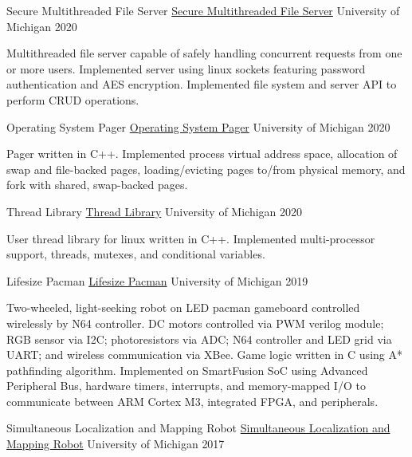 \documentclass[11pt, a4paper]{cv}
\begin{document}
\begin{cv}
\begin{projects}
\begin{cventries}
\cventrycompact
{\ifstrempty{}
{Secure Multithreaded File Server}
{\color{hrefblue}\href{}{Secure Multithreaded File Server}}}
{}
{University of Michigan}
{2020}
{\begin{cvparagraph}
Multithreaded file server capable of safely handling concurrent requests from one or more users. Implemented server using linux sockets featuring password authentication and AES encryption. Implemented file system and server API to perform CRUD operations.
\end{cvparagraph}}
\cventrycompact
{\ifstrempty{}
{Operating System Pager}
{\color{hrefblue}\href{}{Operating System Pager}}}
{}
{University of Michigan}
{2020}
{\begin{cvparagraph}
Pager written in C++. Implemented process virtual address space, allocation of swap and file-backed pages, loading/evicting pages to/from physical memory, and fork with shared, swap-backed pages.
\end{cvparagraph}}
\cventrycompact
{\ifstrempty{}
{Thread Library}
{\color{hrefblue}\href{}{Thread Library}}}
{}
{University of Michigan}
{2020}
{\begin{cvparagraph}
User thread library for linux written in C++. Implemented multi-processor support, threads, mutexes, and conditional variables.
\end{cvparagraph}}
\cventrycompact
{
{Lifesize Pacman}
{\color{hrefblue}\href{https://drive.google.com/drive/folders/1HFxNVsQWryOYPgpBHcxYYqhqPPS5R\_EB}{Lifesize Pacman}}}
{}
{University of Michigan}
{2019}
{\begin{cvparagraph}
Two-wheeled, light-seeking robot on LED pacman gameboard controlled wirelessly by N64 controller. DC motors controlled via PWM verilog module; RGB sensor via I2C; photoresistors via ADC; N64 controller and LED grid via UART; and wireless communication via XBee. Game logic written in C using A* pathfinding algorithm. Implemented on SmartFusion SoC using Advanced Peripheral Bus, hardware timers, interrupts, and memory-mapped I/O to communicate between ARM Cortex M3, integrated FPGA, and peripherals.
\end{cvparagraph}}
\cventrycompact
{
{Simultaneous Localization and Mapping Robot}
{\color{hrefblue}\href{https://drive.google.com/drive/folders/1YjzT\_7qpdkZjQ76zcOCCvEo-v1gyrCbw}{Simultaneous Localization and Mapping Robot}}}
{}
{University of Michigan}
{2017}
{\begin{cvparagraph}

\end{cvparagraph}}
\end{cventries}
\end{projects}
\end{cv}
\end{document}
